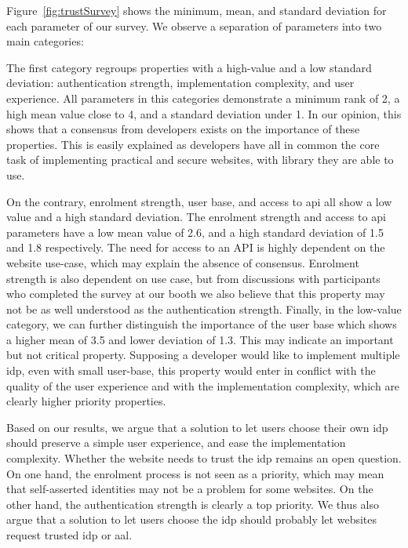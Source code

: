 Figure~\ref{fig:trustSurvey} shows the minimum, mean, and standard deviation for each parameter of our survey.
We observe a separation of parameters into two main categories:

The first category regroups properties with a high-value and a low standard deviation: \ie authentication strength, implementation complexity, and user experience.
All parameters in this categories demonstrate a minimum rank of 2, a high mean value close to 4, and a standard deviation under 1.
In our opinion, this shows that a consensus from developers exists on the importance of these properties.
This is easily explained as developers have all in common the core task of implementing practical and secure websites, with library they are able to use.

On the contrary, enrolment strength, user base, and access to \gls{api} all show a low value and a high standard deviation.
The enrolment strength and access to \gls{api} parameters have a low mean value of 2.6, and a high standard deviation of 1.5 and 1.8 respectively.
The need for access to an API is highly dependent on the website use-case, which may explain the absence of consensus.
Enrolment strength is also dependent on use case, but from discussions with participants who completed the survey at our booth we also believe that this property may not be as well understood as the authentication strength.
Finally, in the low-value category, we can further distinguish the importance of the user base which shows a higher mean of 3.5 and lower deviation of 1.3.
This may indicate an important but not critical property.
Supposing a developer would like to implement multiple \gls{idp}, even with small user-base, this property would enter in conflict with the quality of the user experience and with the implementation complexity, which are clearly higher priority properties.

Based on our results, we argue that a solution to let users choose their own \gls{idp} should preserve a simple user experience, and ease the implementation complexity.
Whether the website needs to trust the \gls{idp} remains an open question.
On one hand, the enrolment process is not seen as a priority, which may mean that self-asserted identities may not be a problem for some websites.
On the other hand, the authentication strength is clearly a top priority.
We thus also argue that a solution to let users choose the \gls{idp} should probably let websites request trusted \gls{idp} or \gls{aal}.


